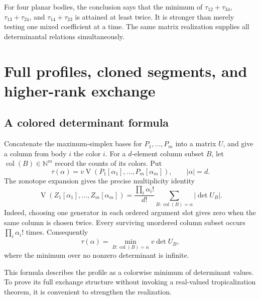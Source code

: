 \documentclass[11pt,a4paper]{article}
\numberwithin{equation}{section}
\theoremstyle{plain}
\newcommand{\N}{\mathbb N}
\newcommand{\MV}{\operatorname{V}}
\begin{document}
For four planar bodies, the conclusion says that the minimum of
$\tau_{12}+\tau_{34}$, $\tau_{13}+\tau_{24}$, and
$\tau_{14}+\tau_{23}$ is attained at least twice. It is stronger than
merely testing one mixed coefficient at a time. The same matrix
realization supplies all determinantal relations simultaneously.

\section{Full profiles, cloned segments, and higher-rank exchange}
\label{poly:mv:sec:profiles}

\subsection{A colored determinant formula}
Concatenate the maximum-simplex bases for $P_1,\ldots,P_m$ into a matrix
$U$, and give a column from body $i$ the color $i$. For a $d$-element
column subset $B$, let $\operatorname{col}(B)\in\N^m$ record the counts
of its colors. Put
\[
 \tau(\alpha)=v\MV(P_1[\alpha_1],\ldots,P_m[\alpha_m]),
 \qquad |\alpha|=d.
\]
The zonotope expansion gives the precise multiplicity identity
\begin{equation}
\label{poly:mv:eq:colored-sum}
 \MV(Z_1[\alpha_1],\ldots,Z_m[\alpha_m])
 =\frac{\prod_i\alpha_i!}{d!}
    \sum_{B:\operatorname{col}(B)=\alpha}|\det U_B|.
\end{equation}
Indeed, choosing one generator in each ordered argument slot gives zero
when the same column is chosen twice. Every surviving unordered column
subset occurs $\prod_i\alpha_i!$ times. Consequently
\begin{equation}
\label{poly:mv:eq:colored-min}
 \tau(\alpha)=\min_{B:\operatorname{col}(B)=\alpha}v\det U_B,
\end{equation}
where the minimum over no nonzero determinant is infinite.

This formula describes the profile as a colorwise minimum of determinant
values. To prove its full exchange structure without invoking a
real-valued tropicalization theorem, it is convenient to strengthen the
realization.
\end{document}
